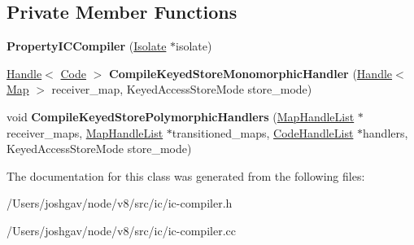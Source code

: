 \subsection*{Private Member Functions}
\begin{DoxyCompactItemize}
\item 
{\bfseries Property\+I\+C\+Compiler} (\hyperlink{classv8_1_1internal_1_1_isolate}{Isolate} $\ast$isolate)\hypertarget{classv8_1_1internal_1_1_property_i_c_compiler_a22c0b17c87a8a3e149210672009010a0}{}\label{classv8_1_1internal_1_1_property_i_c_compiler_a22c0b17c87a8a3e149210672009010a0}

\item 
\hyperlink{classv8_1_1internal_1_1_handle}{Handle}$<$ \hyperlink{classv8_1_1internal_1_1_code}{Code} $>$ {\bfseries Compile\+Keyed\+Store\+Monomorphic\+Handler} (\hyperlink{classv8_1_1internal_1_1_handle}{Handle}$<$ \hyperlink{classv8_1_1internal_1_1_map}{Map} $>$ receiver\+\_\+map, Keyed\+Access\+Store\+Mode store\+\_\+mode)\hypertarget{classv8_1_1internal_1_1_property_i_c_compiler_ad79e39fe6ce78f21614e1f38d6a998b6}{}\label{classv8_1_1internal_1_1_property_i_c_compiler_ad79e39fe6ce78f21614e1f38d6a998b6}

\item 
void {\bfseries Compile\+Keyed\+Store\+Polymorphic\+Handlers} (\hyperlink{classv8_1_1internal_1_1_list}{Map\+Handle\+List} $\ast$receiver\+\_\+maps, \hyperlink{classv8_1_1internal_1_1_list}{Map\+Handle\+List} $\ast$transitioned\+\_\+maps, \hyperlink{classv8_1_1internal_1_1_list}{Code\+Handle\+List} $\ast$handlers, Keyed\+Access\+Store\+Mode store\+\_\+mode)\hypertarget{classv8_1_1internal_1_1_property_i_c_compiler_a6d1170dfcf6cfa25ac87ec9826642ac8}{}\label{classv8_1_1internal_1_1_property_i_c_compiler_a6d1170dfcf6cfa25ac87ec9826642ac8}

\end{DoxyCompactItemize}


The documentation for this class was generated from the following files\+:\begin{DoxyCompactItemize}
\item 
/\+Users/joshgav/node/v8/src/ic/ic-\/compiler.\+h\item 
/\+Users/joshgav/node/v8/src/ic/ic-\/compiler.\+cc\end{DoxyCompactItemize}
